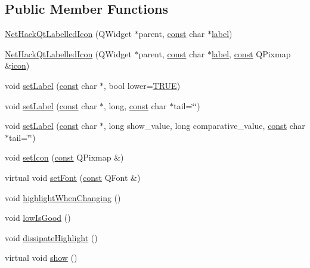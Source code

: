 \subsection*{Public Member Functions}
\begin{DoxyCompactItemize}
\item 
\hyperlink{classNetHackQtLabelledIcon_a8490edd1304f064cfe7008d15a67d0ab}{Net\+Hack\+Qt\+Labelled\+Icon} (Q\+Widget $\ast$parent, \hyperlink{tradstdc_8h_a2c212835823e3c54a8ab6d95c652660e}{const} char $\ast$\hyperlink{classNetHackQtLabelledIcon_aa2a1e63d7c0ded20b3327c57a0f2b859}{label})
\item 
\hyperlink{classNetHackQtLabelledIcon_a05ee917633860bbd89ce482d8a167bfa}{Net\+Hack\+Qt\+Labelled\+Icon} (Q\+Widget $\ast$parent, \hyperlink{tradstdc_8h_a2c212835823e3c54a8ab6d95c652660e}{const} char $\ast$\hyperlink{classNetHackQtLabelledIcon_aa2a1e63d7c0ded20b3327c57a0f2b859}{label}, \hyperlink{tradstdc_8h_a2c212835823e3c54a8ab6d95c652660e}{const} Q\+Pixmap \&\hyperlink{classNetHackQtLabelledIcon_a4e33054b1434bdc8975812ee48b349d1}{icon})
\item 
void \hyperlink{classNetHackQtLabelledIcon_a662b07803a998ea622db0a455dc3904a}{set\+Label} (\hyperlink{tradstdc_8h_a2c212835823e3c54a8ab6d95c652660e}{const} char $\ast$, bool lower=\hyperlink{xpm2img_8c_aa8cecfc5c5c054d2875c03e77b7be15d}{T\+R\+U\+E})
\item 
void \hyperlink{classNetHackQtLabelledIcon_ae94bdc2acb67e7fe26cb779712d9cea7}{set\+Label} (\hyperlink{tradstdc_8h_a2c212835823e3c54a8ab6d95c652660e}{const} char $\ast$, long, \hyperlink{tradstdc_8h_a2c212835823e3c54a8ab6d95c652660e}{const} char $\ast$tail=\char`\"{}\char`\"{})
\item 
void \hyperlink{classNetHackQtLabelledIcon_a1cf59e5214d9fa89e7ef325c0f17c9cd}{set\+Label} (\hyperlink{tradstdc_8h_a2c212835823e3c54a8ab6d95c652660e}{const} char $\ast$, long show\+\_\+value, long comparative\+\_\+value, \hyperlink{tradstdc_8h_a2c212835823e3c54a8ab6d95c652660e}{const} char $\ast$tail=\char`\"{}\char`\"{})
\item 
void \hyperlink{classNetHackQtLabelledIcon_a864ac9e8f029d1cad10daa3694782254}{set\+Icon} (\hyperlink{tradstdc_8h_a2c212835823e3c54a8ab6d95c652660e}{const} Q\+Pixmap \&)
\item 
virtual void \hyperlink{classNetHackQtLabelledIcon_a8c5f866976dd038862232e4c2b777b52}{set\+Font} (\hyperlink{tradstdc_8h_a2c212835823e3c54a8ab6d95c652660e}{const} Q\+Font \&)
\item 
void \hyperlink{classNetHackQtLabelledIcon_aee1b2f7cf1def28f4649b02f57422b81}{highlight\+When\+Changing} ()
\item 
void \hyperlink{classNetHackQtLabelledIcon_a3321c5c57fc081bfb0357124e5d44023}{low\+Is\+Good} ()
\item 
void \hyperlink{classNetHackQtLabelledIcon_a9071c1766bc433ad1187a8a8466a3fb2}{dissipate\+Highlight} ()
\item 
virtual void \hyperlink{classNetHackQtLabelledIcon_a9f8cee0b86e62633d03a94e98bbba656}{show} ()
\end{DoxyCompactItemize}
